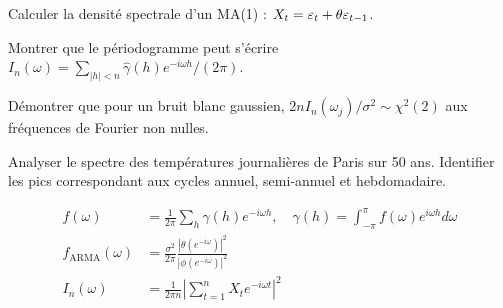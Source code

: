 \begin{exercice}[$\star$]
Calculer la densit\'e spectrale d'un MA(1) : $X_t=\varepsilon_t+\theta\varepsilon_{t-1}$.
\end{exercice}

\begin{exercice}[$\star\star$]
Montrer que le p\'eriodogramme peut s'\'ecrire $I_n(\omega)=\sum_{|h|<n}\hat\gamma(h)e^{-i\omega h}/(2\pi)$.
\end{exercice}

\begin{exercice}[$\star\star$]
D\'emontrer que pour un bruit blanc gaussien, $2nI_n(\omega_j)/\sigma^2\sim\chi^2(2)$ aux fr\'equences de Fourier non nulles.
\end{exercice}

\begin{exercice}
Analyser le spectre des temp\'eratures journali\`eres de Paris sur 50 ans. Identifier les pics correspondant aux cycles annuel, semi-annuel et hebdomadaire.
\end{exercice}

\begin{formules}
\begin{align*}
f(\omega) &= \frac{1}{2\pi}\sum_{h}\gamma(h)e^{-i\omega h}, \quad \gamma(h)=\int_{-\pi}^{\pi}f(\omega)e^{i\omega h}d\omega \\
f_{\text{ARMA}}(\omega) &= \frac{\sigma^2}{2\pi}\frac{|\theta(e^{-i\omega})|^2}{|\phi(e^{-i\omega})|^2} \\
I_n(\omega) &= \frac{1}{2\pi n}\left|\sum_{t=1}^n X_t e^{-i\omega t}\right|^2
\end{align*}
\end{formules}
